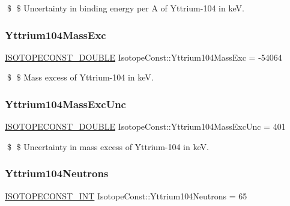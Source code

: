 \$ \$ Uncertainty in binding energy per A of Yttrium-\/104 in keV. \mbox{\label{group___isotope_const-_yttrium-_y104_ga355b6a18bba637f64213e09bc3a51a57}} 
\subsubsection{\texorpdfstring{Yttrium104\+Mass\+Exc}{Yttrium104MassExc}}
{\footnotesize\ttfamily \mbox{\hyperlink{group___isotope_const-_macros_ga8f45a7272ce02c0b4c65c44636ed719a}{I\+S\+O\+T\+O\+P\+E\+C\+O\+N\+S\+T\+\_\+\+D\+O\+U\+B\+LE}} Isotope\+Const\+::\+Yttrium104\+Mass\+Exc = -\/54064}

\$ \$ Mass excess of Yttrium-\/104 in keV. \mbox{\label{group___isotope_const-_yttrium-_y104_ga56add808452e4e840f8ba36522c042ed}} 
\subsubsection{\texorpdfstring{Yttrium104\+Mass\+Exc\+Unc}{Yttrium104MassExcUnc}}
{\footnotesize\ttfamily \mbox{\hyperlink{group___isotope_const-_macros_ga8f45a7272ce02c0b4c65c44636ed719a}{I\+S\+O\+T\+O\+P\+E\+C\+O\+N\+S\+T\+\_\+\+D\+O\+U\+B\+LE}} Isotope\+Const\+::\+Yttrium104\+Mass\+Exc\+Unc = 401}

\$ \$ Uncertainty in mass excess of Yttrium-\/104 in keV. \mbox{\label{group___isotope_const-_yttrium-_y104_gafc2edc036fb6efa57680b9d480b7b89e}} 
\subsubsection{\texorpdfstring{Yttrium104\+Neutrons}{Yttrium104Neutrons}}
{\footnotesize\ttfamily \mbox{\hyperlink{group___isotope_const-_macros_ga5f18360b3e99483a35c32d789e62621c}{I\+S\+O\+T\+O\+P\+E\+C\+O\+N\+S\+T\+\_\+\+I\+NT}} Isotope\+Const\+::\+Yttrium104\+Neutrons = 65}

